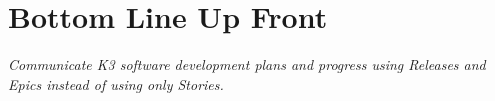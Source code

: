 \documentclass[letterpaper,11pt]{texMemo} %
\begin{document}
\maketitle %


\section*{Bottom Line Up Front}

\emph{Communicate K3 software development plans and progress using \emph{Releases} and \emph{Epics} instead of using only \emph{Stories}.}






%
%

\end{document}

